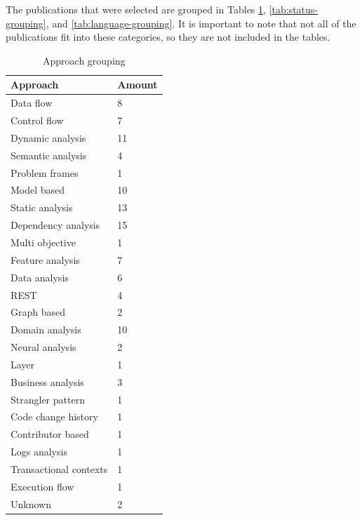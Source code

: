\documentclass[conference]{IEEEtran}
\begin{document}
The publications that were selected are grouped in Tables
\ref{tab:approach-grouping}, \ref{tab:status-grouping}, and
\ref{tab:language-grouping}. It is important to note that not all of the
publications fit into these categories, so they are not included in the tables.

\begin{table}[!htb] \caption{Approach grouping} \label{tab:approach-grouping}
  \begin{center}
    \begin{tabular}[c]{p{12em}|p{4em}}
      \textbf{Approach} &
      \textbf{Amount} \\
      \hline Data flow & {8} \\
      \hline Control flow & {7} \\
      \hline Dynamic analysis & {11} \\
      \hline Semantic analysis & {4} \\
      \hline Problem frames & {1} \\
      \hline Model based & {10} \\
      \hline Static analysis & {13} \\
      \hline Dependency analysis & {15} \\
      \hline Multi objective & {1} \\
      \hline Feature analysis & {7} \\
      \hline Data analysis & {6} \\
      \hline REST & {4} \\
      \hline Graph based & {2} \\
      \hline Domain analysis & {10} \\
      \hline Neural analysis & {2} \\
      \hline Layer & {1} \\
      \hline Business analysis & {3} \\
      \hline Strangler pattern & {1} \\
      \hline Code change history & {1} \\
      \hline Contributor based & {1} \\
      \hline Logs analysis & {1} \\
      \hline Transactional contexts & {1} \\
      \hline Execution flow & {1} \\
      \hline Unknown & {2} \\
    \end{tabular}
  \end{center}
\end{table}
\end{document}
